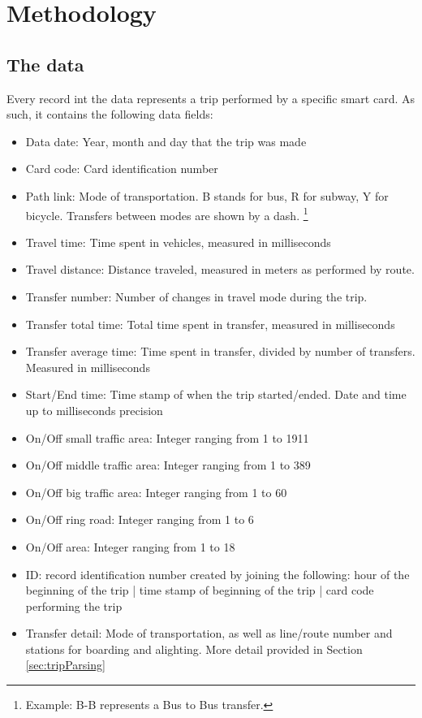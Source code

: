 \documentclass{article}
\begin{document}
\newpage
\section{Methodology}
\subsection{The data}
\label{sec:data}
Every record int the data represents a trip performed by a specific smart card. As such, it contains the following data fields:

\begin{itemize}
\item Data date: Year, month and day that the trip was made
\item Card code: Card identification number
\item Path link: Mode of transportation. B stands for bus, R for subway, Y for bicycle. Transfers between modes are shown by a dash. \footnote{Example: B-B represents a Bus to Bus transfer.} 
\item Travel time: Time spent in vehicles, measured in milliseconds
\item Travel distance: Distance traveled, measured in meters as performed by route. 
\item Transfer number: Number of changes in travel mode during the trip. 
\item Transfer total time: Total time spent in transfer, measured in milliseconds\item Transfer average time: Time spent in transfer, divided by number of transfers. Measured in milliseconds
\item Start/End time: Time stamp of when the trip started/ended. Date and time up to milliseconds precision
\item On/Off small traffic area: Integer ranging from 1 to 1911
\item On/Off middle traffic area: Integer ranging from 1 to 389
\item On/Off big traffic area: Integer ranging from 1 to 60
\item On/Off ring road: Integer ranging from 1 to 6
\item On/Off area: Integer ranging from 1 to 18
\item ID: record identification number created by joining the following: hour of the beginning of the trip | time stamp of beginning of the trip | card code performing the trip
\item Transfer detail: Mode of transportation, as well as line/route number and stations for boarding and alighting. More detail provided in Section \ref{sec:tripParsing}
\end{itemize}
\end{document}
